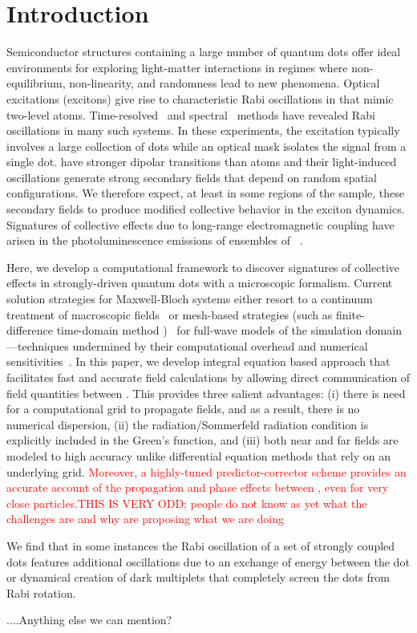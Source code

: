 \section{\label{sec:introduction}Introduction}
Semiconductor structures containing a large number of quantum dots offer ideal environments for exploring light-matter interactions in regimes where non-equilibrium, non-linearity, and randomness lead to new phenomena.
Optical excitations (excitons) give rise to characteristic Rabi oscillations in \qds{} that mimic two-level atoms.
Time-resolved~\cite{stievater,shih} and spectral~\cite{kamada} methods have revealed Rabi oscillations in many such systems.
In these experiments, the excitation typically involves a large collection of dots while an optical mask isolates the signal from a single dot.
\Qds{} have stronger dipolar transitions than atoms and their light-induced oscillations generate strong secondary fields that depend on random spatial configurations.
We therefore expect, at least in some regions of the sample, these secondary fields to produce modified collective behavior in the exciton dynamics.
Signatures of collective effects due to long-range electromagnetic coupling have arisen in the photoluminescence emissions of ensembles of \qds{}~\cite{forchel}.

Here, we develop a computational framework to discover signatures of collective effects in strongly-driven quantum dots with a microscopic formalism.
Current solution strategies for Maxwell-Bloch systems either resort to a continuum treatment of macroscopic fields~\cite{} or mesh-based strategies (such as finite-difference time-domain method )~\cite{Vanneste2001, Fratalocchi2008} for full-wave models of the simulation domain---techniques undermined by their computational overhead and numerical sensitivities~\cite{Baczewski2013}.
In this paper, we develop integral equation based approach that facilitates fast and accurate field calculations by allowing direct communication of field quantities between \qds{}. This provides three salient advantages: (i) there is need for a computational grid to propagate fields, and as a result, there is no numerical dispersion, (ii) the radiation/Sommerfeld radiation condition is explicitly included in the Green's function, and (iii) both near and far fields are modeled to high accuracy unlike differential equation methods that rely on an underlying grid. \textcolor{red}{
Moreover, a highly-tuned predictor-corrector scheme provides an accurate account of the propagation and phase effects between \qds{}, even for very close particles.THIS IS VERY ODD; people do not know as yet what the challenges are and why are proposing what we are doing} 

We find that in some instances the Rabi oscillation of a set of strongly coupled dots features additional oscillations due to an exchange of energy between the dot or dynamical creation of dark multiplets that completely screen the dots from Rabi rotation.


....Anything else we can mention?
